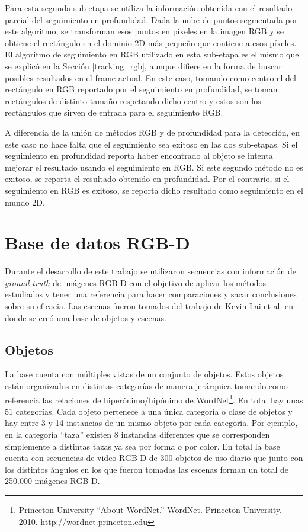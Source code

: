 Para esta segunda sub-etapa se utiliza la información obtenida con el resultado parcial del seguimiento en profundidad. Dada la nube de puntos segmentada por este algoritmo, se transforman esos puntos en píxeles en la imagen RGB y se obtiene el rectángulo en el dominio 2D más pequeño que contiene a esos píxeles. El algoritmo de seguimiento en RGB utilizado en esta sub-etapa es el mismo que se explicó en la Sección \ref{tracking_rgb}, aunque difiere en la forma de buscar posibles resultados en el frame actual. En este caso, tomando como centro el del rectángulo en RGB reportado por el seguimiento en profundidad, se toman rectángulos de distinto tamaño respetando dicho centro y estos son los rectángulos que sirven de entrada para el seguimiento RGB.

A diferencia de la unión de métodos RGB y de profundidad para la detección, en este caso no hace falta que el seguimiento sea exitoso en las dos sub-etapas. Si el seguimiento en profundidad reporta haber encontrado al objeto se intenta mejorar el resultado usando el seguimiento en RGB. Si este segundo método no es exitoso, se reporta el resultado obtenido en profundidad. Por el contrario, si el seguimiento en RGB es exitoso, se reporta dicho resultado como seguimiento en el mundo 2D.




\chapter{Base de datos RGB-D}\label{base_rgbd}
Durante el desarrollo de este trabajo se utilizaron secuencias con información de \textit{ground truth} de imágenes RGB-D con el objetivo de aplicar los métodos estudiados y tener una referencia para hacer comparaciones y sacar conclusiones sobre su eficacia. Las escenas fueron tomados del trabajo de Kevin Lai et al. \cite{lai2011large} en donde se creó una base de objetos y escenas.

\section{Objetos}
La base cuenta con múltiples vistas de un conjunto de objetos. Estos objetos están organizados en distintas categorías de manera jerárquica tomando como referencia las relaciones de hiperónimo/hipónimo de WordNet\footnote{Princeton University ``About WordNet.'' WordNet. Princeton University. 2010. http://wordnet.princeton.edu}. En total hay unas 51 categorías. Cada objeto pertenece a una única categoría o clase de objetos y hay entre 3 y 14 instancias de un mismo objeto por cada categoría. Por ejemplo, en la categoría ``taza'' existen 8 instancias diferentes que se corresponden simplemente a distintas tazas ya sea por forma o por color. En total la base cuenta con secuencias de video RGB-D de 300 objetos de uso diario que junto con los distintos ángulos en los que fueron tomadas las escenas forman un total de 250.000 imágenes RGB-D.

